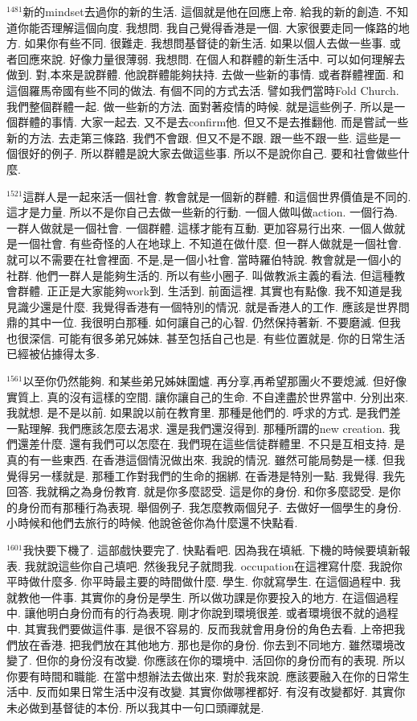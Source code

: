 \documentclass{book}
\begin{document}
$^{1481}$新的mindset去過你的新的生活.
這個就是他在回應上帝.
給我的新的創造.
不知道你能否理解這個向度.
我想問.
我自己覺得香港是一個.
大家很要走同一條路的地方.
如果你有些不同.
很難走.
我想問基督徒的新生活.
如果以個人去做一些事.
或者回應來說.
好像力量很薄弱.
我想問.
在個人和群體的新生活中.
可以如何理解去做到.
對,本來是說群體.
他說群體能夠扶持.
去做一些新的事情.
或者群體裡面.
和這個羅馬帝國有些不同的做法.
有個不同的方式去活.
譬如我們當時Fold Church.
我們整個群體一起.
做一些新的方法.
面對著疫情的時候.
就是這些例子.
所以是一個群體的事情.
大家一起去.
又不是去confirm他.
但又不是去推翻他.
而是嘗試一些新的方法.
去走第三條路.
我們不會跟.
但又不是不跟.
跟一些不跟一些.
這些是一個很好的例子.
所以群體是說大家去做這些事.
所以不是說你自己.
要和社會做些什麼.

$^{1521}$這群人是一起來活一個社會.
教會就是一個新的群體.
和這個世界價值是不同的.
這才是力量.
所以不是你自己去做一些新的行動.
一個人做叫做action.
一個行為.
一群人做就是一個社會.
一個群體.
這樣才能有互動.
更加容易行出來.
一個人做就是一個社會.
有些奇怪的人在地球上.
不知道在做什麼.
但一群人做就是一個社會.
就可以不需要在社會裡面.
不是,是一個小社會.
當時羅伯特說.
教會就是一個小的社群.
他們一群人是能夠生活的.
所以有些小圈子.
叫做教派主義的看法.
但這種教會群體.
正正是大家能夠work到.
生活到.
前面這裡.
其實也有點像.
我不知道是我見識少還是什麼.
我覺得香港有一個特別的情況.
就是香港人的工作.
應該是世界問鼎的其中一位.
我很明白那種.
如何讓自己的心智.
仍然保持著新.
不要磨滅.
但我也很深信.
可能有很多弟兄姊妹.
甚至包括自己也是.
有些位置就是.
你的日常生活已經被佔據得太多.

$^{1561}$以至你仍然能夠.
和某些弟兄姊妹圍爐.
再分享,再希望那團火不要熄滅.
但好像實質上.
真的沒有這樣的空間.
讓你讓自己的生命.
不自達盡於世界當中.
分別出來.
我就想.
是不是以前.
如果說以前在教育里.
那種是他們的.
呼求的方式.
是我們差一點理解.
我們應該怎麼去渴求.
還是我們還沒得到.
那種所謂的new creation.
我們還差什麼.
還有我們可以怎麼在.
我們現在這些信徒群體里.
不只是互相支持.
是真的有一些東西.
在香港這個情況做出來.
我說的情況.
雖然可能局勢是一樣.
但我覺得另一樣就是.
那種工作對我們的生命的捆綁.
在香港是特別一點.
我覺得.
我先回答.
我就稱之為身份教育.
就是你多麼認受.
這是你的身份.
和你多麼認受.
是你的身份而有那種行為表現.
舉個例子.
我怎麼教兩個兒子.
去做好一個學生的身份.
小時候和他們去旅行的時候.
他說爸爸你為什麼還不快點看.

$^{1601}$我快要下機了.
這部戲快要完了.
快點看吧.
因為我在填紙.
下機的時候要填新報表.
我就說這些你自己填吧.
然後我兒子就問我.
occupation在這裡寫什麼.
我說你平時做什麼多.
你平時最主要的時間做什麼.
學生.
你就寫學生.
在這個過程中.
我就教他一件事.
其實你的身份是學生.
所以做功課是你要投入的地方.
在這個過程中.
讓他明白身份而有的行為表現.
剛才你說到環境很差.
或者環境很不就的過程中.
其實我們要做這件事.
是很不容易的.
反而我就會用身份的角色去看.
上帝把我們放在香港.
把我們放在其他地方.
那也是你的身份.
你去到不同地方.
雖然環境改變了.
但你的身份沒有改變.
你應該在你的環境中.
活回你的身份而有的表現.
所以你要有時間和職能.
在當中想辦法去做出來.
對於我來說.
應該要融入在你的日常生活中.
反而如果日常生活中沒有改變.
其實你做哪裡都好.
有沒有改變都好.
其實你未必做到基督徒的本份.
所以我其中一句口頭禪就是.
\end{document}
